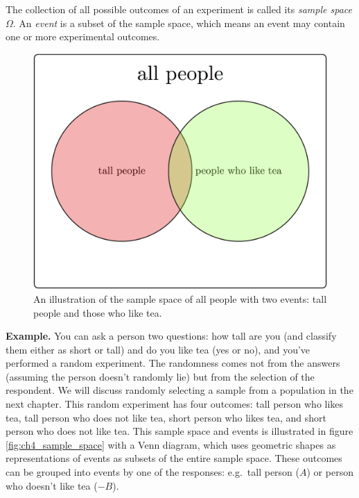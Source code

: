 \documentclass[
  letterpaper,
  DIV=11,
  numbers=noendperiod]{scrreprt}
\begin{document}
\begin{tcolorbox}[enhanced jigsaw, coltitle=black, arc=.35mm, opacitybacktitle=0.6, breakable, bottomtitle=1mm, toptitle=1mm, titlerule=0mm, colback=white, leftrule=.75mm, rightrule=.15mm, colframe=quarto-callout-note-color-frame, colbacktitle=quarto-callout-note-color!10!white, opacityback=0, title=\textcolor{quarto-callout-note-color}{\faInfo}\hspace{0.5em}{Definition}, left=2mm, toprule=.15mm, bottomrule=.15mm]

The collection of all possible outcomes of an experiment is called its
\emph{sample space} \(\Omega\). An \emph{event} is a subset of the
sample space, which means an event may contain one or more experimental
outcomes.

\end{tcolorbox}

\begin{figure}

{\centering \includegraphics{./ch4/sample_space.png}

}

\caption{An illustration of the sample space of all people with two
events: tall people and those who like tea.}

\end{figure}

\textbf{Example.} You can ask a person two questions: how tall are you
(and classify them either as short or tall) and do you like tea (yes or
no), and you've performed a random experiment. The randomness comes not
from the answers (assuming the person doesn't randomly lie) but from the
selection of the respondent. We will discuss randomly selecting a sample
from a population in the next chapter. This random experiment has four
outcomes: tall person who likes tea, tall person who does not like tea,
short person who likes tea, and short person who does not like tea. This
sample space and events is illustrated in figure
\ref{fig:ch4_sample_space} with a Venn diagram, which uses geometric
shapes as representations of events as subsets of the entire sample
space. These outcomes can be grouped into events by one of the
responses: e.g.~tall person (\(A\)) or person who doesn't like tea
(\(-B\)).
\end{document}
